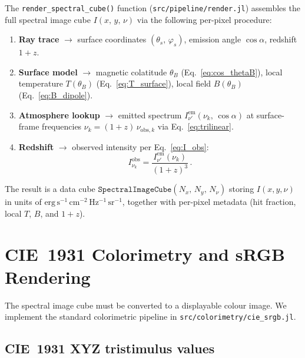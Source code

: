 The \texttt{render\_spectral\_cube()} function
(\texttt{src/pipeline/render.jl}) assembles the full spectral image cube
$I(x,\,y,\,\nu)$ via the following per-pixel procedure:
\begin{enumerate}
  \item \textbf{Ray trace} $\to$ surface coordinates
    $(\theta_s,\,\varphi_s)$, emission angle $\cos\alpha$, redshift $1{+}z$.
  \item \textbf{Surface model} $\to$ magnetic colatitude $\theta_B$
    (Eq.~\ref{eq:cos_thetaB}), local temperature $T(\theta_B)$
    (Eq.~\ref{eq:T_surface}), local field $B(\theta_B)$
    (Eq.~\ref{eq:B_dipole}).
  \item \textbf{Atmosphere lookup} $\to$ emitted spectrum
    $I_{\nu'}^{\mathrm{em}}(\nu_k,\,\cos\alpha)$ at surface-frame
    frequencies $\nu_k = (1{+}z)\,\nu_{\mathrm{obs},k}$
    via Eq.~\eqref{eq:trilinear}.
  \item \textbf{Redshift} $\to$ observed intensity per
    Eq.~\eqref{eq:I_obs}:
    \begin{equation}
      I_{\nu_k}^{\mathrm{obs}} = \frac{I_{\nu'}^{\mathrm{em}}(\nu_k)}{(1 + z)^{3}}\,.
      \label{eq:pixel_redshift}
    \end{equation}
\end{enumerate}
The result is a data cube
$\texttt{SpectralImageCube}(N_x,\,N_y,\,N_\nu)$ storing $I(x,y,\nu)$
in units of $\mathrm{erg\,s^{-1}\,cm^{-2}\,Hz^{-1}\,sr^{-1}}$, together
with per-pixel metadata (hit fraction, local $T$, $B$, and $1{+}z$).


\section{CIE~1931 Colorimetry and sRGB Rendering}
\label{sec:colorimetry}

The spectral image cube must be converted to a displayable colour image.
We implement the standard colorimetric pipeline in
\texttt{src/colorimetry/cie\_srgb.jl}.

\subsection{CIE~1931 XYZ tristimulus values}

